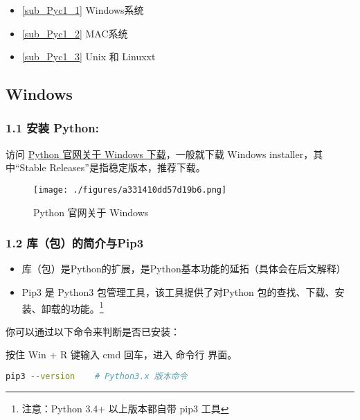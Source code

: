 
\begin{itemize}
\item \autoref{sub_Pyc1_1} Windows系统
\item \autoref{sub_Pyc1_2} MAC系统
\item \autoref{sub_Pyc1_3} Unix 和 Linuxxt
\end{itemize}

\subsection{Windows}\label{sub_Pyc1_1} 

\subsubsection{1.1 安装 Python:}
访问 \href{https://www.python.org/downloads/windows/}{Python 官网关于 Windows 下载}，一般就下载  Windows installer，其中“Stable Releases”是指稳定版本，推荐下载。
\begin{figure}[ht]
\centering
\texttt{[image: ./figures/a331410dd57d19b6.png]}
\caption{Python 官网关于 Windows} \label{fig_Python_1}
\end{figure}

\subsubsection{1.2 库（包）的简介与Pip3}

\begin{itemize}
\item 库（包）是Python的扩展，是Python基本功能的延拓（具体会在后文解释）
\item Pip3 是 Python3 包管理工具，该工具提供了对Python 包的查找、下载、安装、卸载的功能。\footnote{注意：Python 3.4+ 以上版本都自带 pip3 工具}
\end{itemize}

你可以通过以下命令来判断是否已安装：

按住 Win + R 键输入 cmd 回车，进入 命令行 界面。


\begin{lstlisting}[language=bash]
pip3 --version    # Python3.x 版本命令
\end{lstlisting}

